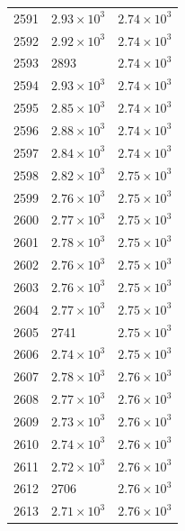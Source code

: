 \begin{table}[H]
\begin{tabular}{lll}
2591 & $\displaystyle 2.93 \times 10^{3}$ & $\displaystyle 2.74 \times 10^{3}$ \\
2592 & $\displaystyle 2.92 \times 10^{3}$ & $\displaystyle 2.74 \times 10^{3}$ \\
2593 & 2893 & $\displaystyle 2.74 \times 10^{3}$ \\
2594 & $\displaystyle 2.93 \times 10^{3}$ & $\displaystyle 2.74 \times 10^{3}$ \\
2595 & $\displaystyle 2.85 \times 10^{3}$ & $\displaystyle 2.74 \times 10^{3}$ \\
2596 & $\displaystyle 2.88 \times 10^{3}$ & $\displaystyle 2.74 \times 10^{3}$ \\
2597 & $\displaystyle 2.84 \times 10^{3}$ & $\displaystyle 2.74 \times 10^{3}$ \\
2598 & $\displaystyle 2.82 \times 10^{3}$ & $\displaystyle 2.75 \times 10^{3}$ \\
2599 & $\displaystyle 2.76 \times 10^{3}$ & $\displaystyle 2.75 \times 10^{3}$ \\
2600 & $\displaystyle 2.77 \times 10^{3}$ & $\displaystyle 2.75 \times 10^{3}$ \\
2601 & $\displaystyle 2.78 \times 10^{3}$ & $\displaystyle 2.75 \times 10^{3}$ \\
2602 & $\displaystyle 2.76 \times 10^{3}$ & $\displaystyle 2.75 \times 10^{3}$ \\
2603 & $\displaystyle 2.76 \times 10^{3}$ & $\displaystyle 2.75 \times 10^{3}$ \\
2604 & $\displaystyle 2.77 \times 10^{3}$ & $\displaystyle 2.75 \times 10^{3}$ \\
2605 & 2741 & $\displaystyle 2.75 \times 10^{3}$ \\
2606 & $\displaystyle 2.74 \times 10^{3}$ & $\displaystyle 2.75 \times 10^{3}$ \\
2607 & $\displaystyle 2.78 \times 10^{3}$ & $\displaystyle 2.76 \times 10^{3}$ \\
2608 & $\displaystyle 2.77 \times 10^{3}$ & $\displaystyle 2.76 \times 10^{3}$ \\
2609 & $\displaystyle 2.73 \times 10^{3}$ & $\displaystyle 2.76 \times 10^{3}$ \\
2610 & $\displaystyle 2.74 \times 10^{3}$ & $\displaystyle 2.76 \times 10^{3}$ \\
2611 & $\displaystyle 2.72 \times 10^{3}$ & $\displaystyle 2.76 \times 10^{3}$ \\
2612 & 2706 & $\displaystyle 2.76 \times 10^{3}$ \\
2613 & $\displaystyle 2.71 \times 10^{3}$ & $\displaystyle 2.76 \times 10^{3}$ \\

\end{tabular}
\end{table}
